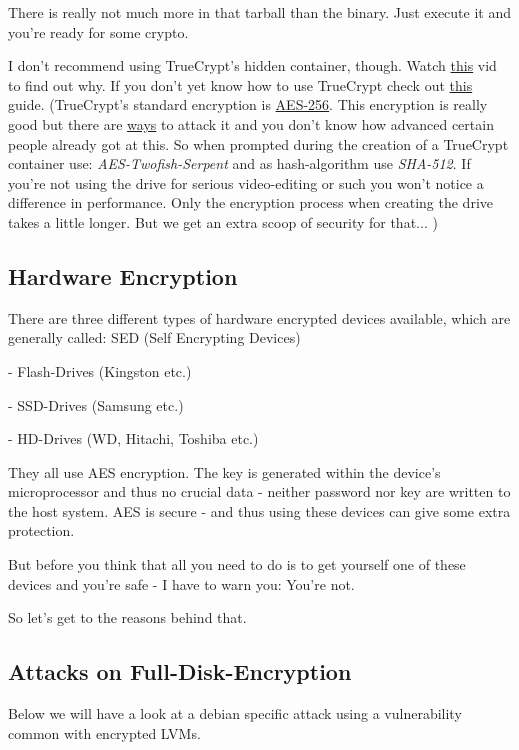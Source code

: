 \documentclass{article}
\begin{document}
 There is really not much more in that tarball than the binary. Just execute it and you're ready for some crypto.


 I don't recommend using TrueCrypt's hidden container, though. Watch \href{http://youtu.be/HHoJ9pQ0cn8}{this} vid to find out why. If you don't yet know how to use TrueCrypt check out \href{https://securityinabox.org/en/truecrypt_main}{this} guide. (TrueCrypt's standard encryption is \href{http://www.moserware.com/2009/09/stick-figure-guide-to-advanced.html}{AES-256}. This encryption is really good but there are \href{https://www.schneier.com/blog/archives/2011/08/new_attack_on_a_1.html}{ways} to attack it and you don't know how advanced certain people already got at this. So when prompted during the creation of a TrueCrypt container use: \emph{AES-Twofish-Serpent} and as hash-algorithm use \emph{SHA-512}. If you're not using the drive for serious video-editing or such you won't notice a difference in performance. Only the encryption process when creating the drive takes a little longer. But we get an extra scoop of security for that... )
\subsection{Hardware Encryption}


 There are three different types of hardware encrypted devices available, which are generally called: SED (Self Encrypting Devices)


 - Flash-Drives (Kingston etc.)

- SSD-Drives (Samsung etc.)

- HD-Drives (WD, Hitachi, Toshiba etc.)


 They all use AES encryption. The key is generated within the device's microprocessor and thus no crucial data - neither password nor key are written to the host system. AES is secure - and thus using these devices can give some extra protection. 


 But before you think that all you need to do is to get yourself one of these devices and you're safe - I have to warn you: You're not. 


 So let's get to the reasons behind that.
\subsection{Attacks on Full-Disk-Encryption}


 Below we will have a look at a debian specific attack using a vulnerability common with encrypted LVMs. 
\end{document}
